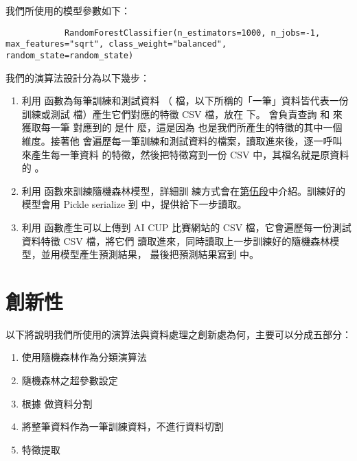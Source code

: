 \documentclass[12pt, a4paper]{article}
\begin{document}
        我們所使用的模型參數如下：
        \begin{lstlisting}
            RandomForestClassifier(n_estimators=1000, n_jobs=-1, max_features="sqrt", class_weight="balanced", random_state=random_state)
        \end{lstlisting}

        我們的演算法設計分為以下幾步：
        \begin{enumerate}
            \item 利用  函數為每筆訓練和測試資料
            （ 檔，以下所稱的「一筆」資料皆代表一份訓練或測試
             檔）產生它們對應的特徵 CSV 檔，放在
            下。 會負責查詢
             和  來
            獲取每一筆  對應到的  是什
            麼，這是因為  也是我們所產生的特徵的其中一個維度。接著他
            會遍歷每一筆訓練和測試資料的檔案，讀取進來後，逐一呼叫
             來產生每一筆資料
            的特徵，然後把特徵寫到一份 CSV 中，其檔名就是原資料的 。

            \item 利用  函數來訓練隨機森林模型，詳細訓
            練方式會在\hyperref[training-method]{第伍段}中介紹。訓練好的模型會用
            Pickle serialize 到  中，提供給下一步讀取。

            \item 利用  函數產生可以上傳到
            AI CUP 比賽網站的 CSV 檔，它會遍歷每一份測試資料特徵 CSV 檔，將它們
            讀取進來，同時讀取上一步訓練好的隨機森林模型，並用模型產生預測結果，
            最後把預測結果寫到
             中。
        \end{enumerate}
    \section{創新性}
        以下將說明我們所使用的演算法與資料處理之創新處為何，主要可以分成五部分：
        \begin{enumerate}
            \item 使用隨機森林作為分類演算法
            \item 隨機森林之超參數設定
            \item 根據  做資料分割
            \item 將整筆資料作為一筆訓練資料，不進行資料切割
            \item 特徵提取
        \end{enumerate}
\end{document}
